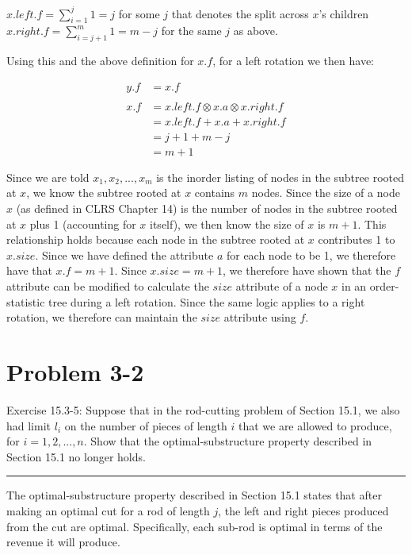 \documentclass[11pt]{article}
\def\separateline{\medskip\hrule\medskip}
\begin{document}
$x.left.f = \sum_{i=1}^j{1} = j$ for some $j$ that denotes the split across $x$'s children\\
$x.right.f = \sum_{i=j+1}^m{1} = m-j$ for the same $j$ as above.

Using this and the above definition for $x.f$, for a left rotation we then have:

\hspace*{3mm}
\begin{equation}
\begin{split}
y.f &= x.f\\
\\
x.f &= x.left.f \otimes x.a \otimes x.right.f\\
    &= x.left.f + x.a + x.right.f\\
    &= j + 1 + m - j\\
    &= m + 1
\end{split}
\end{equation}

Since we are told $x_1, x_2, ..., x_m$ is the inorder listing of nodes in the subtree rooted at $x$, we know the subtree rooted at $x$ contains $m$ nodes. Since the size of a node $x$ (as defined in CLRS Chapter 14) is the number of nodes in the subtree rooted at $x$ plus 1 (accounting for $x$ itself), we then know the size of $x$ is $m + 1$. This relationship holds because each node in the subtree rooted at $x$ contributes 1 to $x.size$. Since we have defined the attribute $a$ for each node to be 1, we therefore have that $x.f = m + 1$. Since $x.size = m + 1$, we therefore have shown that the $f$ attribute can be modified to calculate the $size$ attribute of a node $x$ in an order-statistic tree during a left rotation. Since the same logic applies to a right rotation, we therefore can maintain the $size$ attribute using $f$.

\newpage

\section{Problem 3-2}
Exercise 15.3-5: Suppose that in the rod-cutting problem of Section 15.1, we also had limit $l_i$ on the number of pieces of length $i$ that we are allowed to produce, for $i=1, 2, ..., n$. Show that the optimal-substructure property described in Section 15.1 no longer holds.
\separateline

The optimal-substructure property described in Section 15.1 states that after making an optimal cut for a rod of length $j$, the left and right pieces produced from the cut are optimal. Specifically, each sub-rod is optimal in terms of the revenue it will produce.
\end{document}

